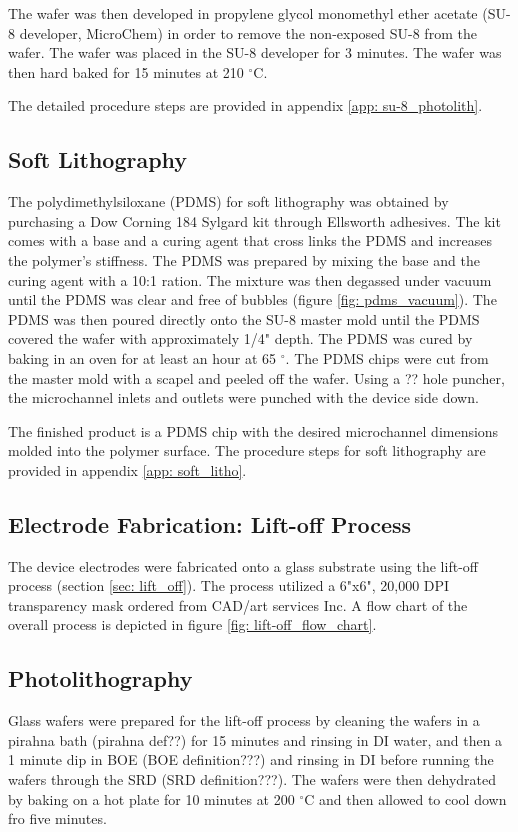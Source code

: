 \par The wafer was then developed in propylene glycol monomethyl ether acetate (SU-8 developer, MicroChem) in order to remove the non-exposed SU-8 from the wafer. The wafer was placed in the SU-8 developer for 3 minutes. The wafer was then hard baked for 15 minutes at 210 $^\circ$C. 

The detailed procedure steps are provided in appendix \ref{app: su-8_photolith}.

\subsection*{Soft Lithography}
\par The polydimethylsiloxane (PDMS) for soft lithography was obtained by purchasing a Dow Corning 184 Sylgard kit through Ellsworth adhesives. The kit comes with a base and a curing agent that cross links the PDMS and increases the polymer's stiffness. The PDMS was prepared by mixing the base and the curing agent with a 10:1 ration. The mixture was then degassed under vacuum until the PDMS was clear and free of bubbles (figure \ref{fig: pdms_vacuum}). The PDMS was then poured directly onto the SU-8 master mold until the PDMS covered the wafer with approximately 1/4" depth. The PDMS was cured by baking in an oven for at least an hour at 65 $^\circ$. The PDMS chips were cut from the master mold with a scapel and peeled off the wafer. Using a ?? hole puncher, the microchannel inlets and outlets were punched with the device side down. 

\par The finished product is a PDMS chip with the desired microchannel dimensions molded into the polymer surface. The procedure steps for soft lithography are provided in appendix \ref{app: soft_litho}.


\subsection{Electrode Fabrication: Lift-off Process}
\par The device electrodes were fabricated onto a glass substrate using the lift-off process (section \ref{sec: lift_off}). The process utilized a 6"x6", 20,000 DPI transparency mask ordered from CAD/art services Inc. A flow chart of the overall process is depicted in figure \ref{fig: lift-off_flow_chart}.

\subsection*{Photolithography}
\par Glass wafers were prepared for the lift-off process by cleaning the wafers in a pirahna bath (pirahna def??) for 15 minutes and rinsing in DI water, and then a 1 minute dip in BOE (BOE definition???) and rinsing in DI before running the wafers through the SRD (SRD definition???). The wafers were then dehydrated by baking on a hot plate for 10 minutes at 200 $^\circ$C and then allowed to cool down fro five minutes. 

